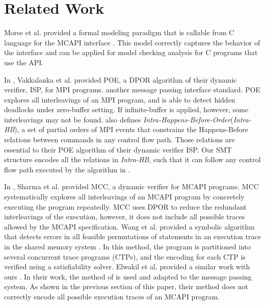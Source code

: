 \section{Related Work}
Morse et al. provided a formal modeling paradigm that is callable from C language for the MCAPI interface \cite{morse:vmcai12}. This model correctly captures the behavior of the interface and can be applied for model checking analysis for C programs that use the API.

In \cite{sarvani:fm09}, Vakkalanka et al. provided POE, a DPOR algorithm \cite{flanagan:popl05} of their dynamic verifier, ISP, for MPI programs\cite{mpi}. another message passing interface standard. POE explores all interleavings of an MPI program, and is able to detect hidden deadlocks under zero-buffer setting. If infinite-buffer is applied, however, some interleavings may not be found. \cite{sarvani:fm09} also defines \textit{Intra-Happens-Before-Order}(\textit{Intra-HB}), a set of partial orders of MPI events that constrains the Happens-Before relations between commands in any control flow path. Those relations are essential to their POE algorithm of their dynamic verifier ISP. Our SMT structure encodes all the relations in \textit{Intra-HB}, such that it can follow any control flow path executed by the algorithm in \cite{sarvani:fm09}.

In \cite{sharma:fmcad09}, Sharma et al. provided MCC, a dynamic verifier for MCAPI programs. MCC systematically explores all interleavings of an MCAPI program by concretely executing the program repeatedly. MCC uses DPOR \cite{flanagan:popl05} to reduce the redundant interleavings of the execution, however, it does not include all possible traces allowed by the MCAPI specification. Wang et al. provided a symbolic algorithm that detects errors in all feasible permutations of statements in an execution trace in the shared memory system \cite{wang:fse09}. In this method, the program is partitioned into several concurrent trace programs (CTPs), and the encoding for each CTP is verified using a satisfiability solver. Elwakil et al. provided a similar work with ours \cite{elwakil:atva10,elwakil:padtad10}. In their work, the method of \cite{wang:fse09} is used and adapted to the message passing system. As shown in the previous section of this paper, their method does not correctly encode all possible execution traces of an MCAPI program.

